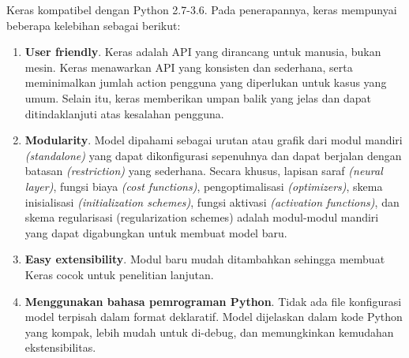 \documentclass[../thesis.tex]{subfiles}
\begin{document}
Keras kompatibel dengan Python 2.7-3.6. Pada penerapannya, keras mempunyai beberapa
kelebihan sebagai berikut:
\begin{enumerate}
	\item \textbf{User friendly}. Keras adalah API yang dirancang untuk manusia, bukan mesin. Keras menawarkan API yang konsisten dan sederhana, serta meminimalkan jumlah action
	pengguna yang diperlukan untuk kasus yang umum. Selain itu, keras memberikan umpan balik yang jelas dan dapat ditindaklanjuti atas kesalahan pengguna.
	\item \textbf{Modularity}. Model dipahami sebagai urutan atau grafik dari modul mandiri \textit{(standalone)}
	yang dapat dikonfigurasi sepenuhnya dan dapat berjalan dengan batasan \textit{(restriction)} yang sederhana. Secara khusus, lapisan saraf \textit{(neural layer)}, fungsi biaya \textit{(cost functions)}, pengoptimalisasi \textit{(optimizers)}, skema inisialisasi \textit{(initialization schemes)}, fungsi aktivasi
	\textit{(activation functions)}, dan skema regularisasi (regularization schemes) adalah modul-modul mandiri yang dapat digabungkan untuk membuat model baru.
	\item \textbf{Easy extensibility}. Modul baru mudah ditambahkan sehingga membuat Keras cocok untuk penelitian lanjutan.
	\item \textbf{Menggunakan bahasa pemrograman Python}. Tidak ada file konfigurasi model
	terpisah dalam format deklaratif. Model dijelaskan dalam kode Python yang kompak,
	lebih mudah untuk di-debug, dan memungkinkan kemudahan ekstensibilitas.
\end{enumerate}
\end{document}
